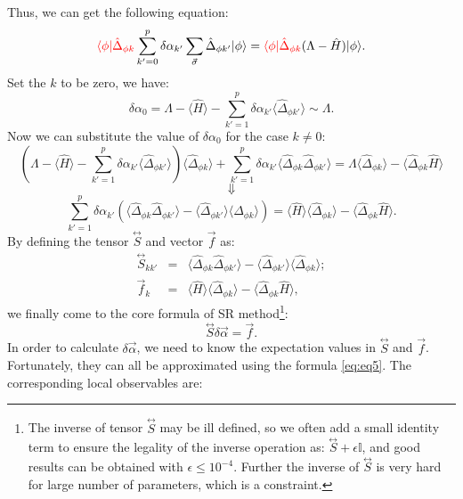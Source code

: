 \documentclass[letterpaper, 10pt]{article}
\newcommand{\qbar}{\rangle}
\newcommand{\qket}{\langle}
\begin{document}
Thus, we can get the following equation:
\[ {\color{red}{\qket\phi| \hat{\Delta}_{\phi k}}} \sum_{k'=0}^p \delta\alpha_{k'} \sum_{\vec{\sigma}} \hat{\Delta}_{\phi k'} |\phi\qbar = {\color{red}{\qket\phi| \hat{\Delta}_{\phi k}}} (\Lambda - \hat{H})|\phi\qbar. \]
Set the $k$ to be zero, we have:
\[ \delta\alpha_0 = \Lambda - \qket \hat{H} \qbar - \sum_{k'=1}^p \delta \alpha_{k'} \qket \hat{\Delta}_{\phi k'} \qbar \sim \Lambda. \]
Now we can substitute the value of $\delta\alpha_0$ for the case $k \neq 0$:
\[
(\Lambda - \qket \hat{H} \qbar - \sum_{k'=1}^p \delta\alpha_{k'} \qket \hat{\Delta}_{\phi k'} \qbar) \qket \hat{\Delta}_{\phi k} \qbar + \sum_{k'=1}^p \delta\alpha_{k'} \qket \hat{\Delta}_{\phi k} \hat{\Delta}_{\phi k'} \qbar = \Lambda \qket \hat{\Delta}_{\phi k} \qbar - \qket \hat{\Delta}_{\phi k} \hat{H} \qbar
\]
\[ \Downarrow \]
\[
\sum_{k'=1}^p \delta\alpha_{k'} (\qket \hat{\Delta}_{\phi k} \hat{\Delta}_{\phi k'} \qbar - \qket \hat{\Delta}_{\phi k'} \qbar \qket \hat{\Delta}_{\phi k} \qbar) = \qket \hat{H} \qbar \qket \hat{\Delta}_{\phi k} \qbar - \qket \hat{\Delta}_{\phi k} \hat{H} \qbar.
\]
By defining the tensor $\stackrel{\leftrightarrow}{S}$ and vector $\vec{f}$ as:
\begin{eqnarray*}
\stackrel{\leftrightarrow}{S}_{k k'} & = & \qket \hat{\Delta}_{\phi k} \hat{\Delta}_{\phi k'} \qbar - \qket \hat{\Delta}_{\phi k'} \qbar \qket \hat{\Delta}_{\phi k} \qbar;\\
\vec{f}_k & = & \qket \hat{H} \qbar \qket \hat{\Delta}_{\phi k} \qbar - \qket \hat{\Delta}_{\phi k} \hat{H} \qbar,
\end{eqnarray*}
we finally come to the core formula of SR method\footnote{The inverse of tensor $\stackrel{\leftrightarrow}{S}$ may be ill defined, so we often add a small identity term to ensure the legality of the inverse operation as: $\stackrel{\leftrightarrow}{S} + \epsilon \mathbb{I}$, and good results can be obtained with $\epsilon \leq 10^{-4}$. Further the inverse of $\stackrel{\leftrightarrow}{S}$ is very hard for large number of parameters, which is a constraint.}:
\[ \stackrel{\leftrightarrow}{S} \delta \vec{\alpha} = \vec{f}. \]
In order to calculate $\delta \vec{\alpha}$, we need to know the expectation values in $\stackrel{\leftrightarrow}{S}$ and $\vec{f}$. Fortunately, they can all be approximated using the formula \ref{eq:eq5}. The corresponding local observables are:
\end{document}
